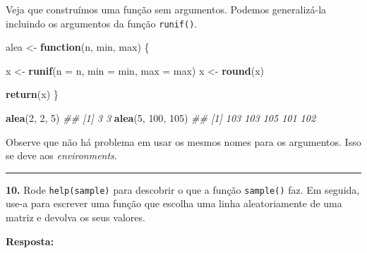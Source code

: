 \documentclass[]{book}
\newenvironment{Shaded}{\begin{snugshade}}{\end{snugshade}}
\newcommand{\CommentTok}[1]{\textcolor[rgb]{0.56,0.35,0.01}{\textit{#1}}}
\newcommand{\ControlFlowTok}[1]{\textcolor[rgb]{0.13,0.29,0.53}{\textbf{#1}}}
\newcommand{\DataTypeTok}[1]{\textcolor[rgb]{0.13,0.29,0.53}{#1}}
\newcommand{\DecValTok}[1]{\textcolor[rgb]{0.00,0.00,0.81}{#1}}
\newcommand{\KeywordTok}[1]{\textcolor[rgb]{0.13,0.29,0.53}{\textbf{#1}}}
\newcommand{\NormalTok}[1]{#1}
\newcommand{\StringTok}[1]{\textcolor[rgb]{0.31,0.60,0.02}{#1}}
\begin{document}
Veja que construímos uma função sem argumentos. Podemos generalizá-la incluindo os argumentos da função \texttt{runif()}.

\begin{Shaded}
\begin{Highlighting}[]
\NormalTok{alea <-}\StringTok{ }\ControlFlowTok{function}\NormalTok{(n, min, max) \{}
  
\NormalTok{  x <-}\StringTok{ }\KeywordTok{runif}\NormalTok{(}\DataTypeTok{n =}\NormalTok{ n, }\DataTypeTok{min =}\NormalTok{ min, }\DataTypeTok{max =}\NormalTok{ max)}
\NormalTok{  x <-}\StringTok{ }\KeywordTok{round}\NormalTok{(x)}
  
  \KeywordTok{return}\NormalTok{(x)}
\NormalTok{\}}

\KeywordTok{alea}\NormalTok{(}\DecValTok{2}\NormalTok{, }\DecValTok{2}\NormalTok{, }\DecValTok{5}\NormalTok{)}
\CommentTok{## [1] 3 3}
\KeywordTok{alea}\NormalTok{(}\DecValTok{5}\NormalTok{, }\DecValTok{100}\NormalTok{, }\DecValTok{105}\NormalTok{)}
\CommentTok{## [1] 103 103 105 101 102}
\end{Highlighting}
\end{Shaded}

Observe que não há problema em usar os mesmos nomes para os argumentos. Isso se deve aos \emph{environments}.

\begin{center}\rule{0.5\linewidth}{0.5pt}\end{center}

\textbf{10.} Rode \texttt{help(sample)} para descobrir o que a função \texttt{sample()} faz. Em seguida, use-a para escrever uma função que escolha uma linha aleatoriamente de uma matriz e devolva os seus valores.

\textbf{Resposta:}
\end{document}
